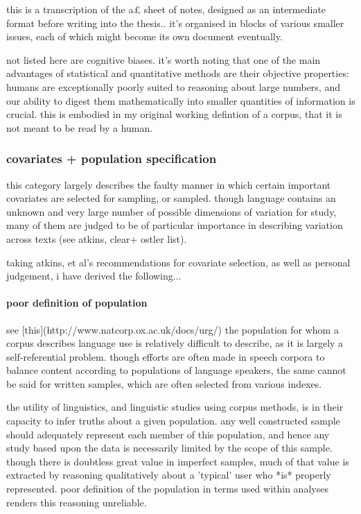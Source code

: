 


this is a transcription of the a£ sheet of notes, designed as an intermediate format before writing into the thesis..  it's organised in blocks of various smaller issues, each of which might become its own document eventually.

not listed here are cognitive biases.  it's worth noting that one of the main advantages of statistical and quantitative methods are their objective properties: humans are exceptionally poorly suited to reasoning about large numbers, and our ability to digest them mathematically into smaller quantities of information is crucial.  this is embodied in my original working defintion of a corpus, that it is not meant to be read by a human.  


\subsubsection{covariates + population specification}
this category largely describes the faulty manner in which certain important covariates are selected for sampling, or sampled.  though language contains an unknown and very large number of possible dimensions of variation for study, many of them are judged to be of particular importance in describing variation across texts (see atkins, clear+ ostler list).

taking atkins, et al's recommendations for covariate selection, as well as personal judgement, i have derived the following...



\paragraph{ poor definition of population}
see [this](http://www.natcorp.ox.ac.uk/docs/urg/)
the population for whom a corpus describes language use is relatively difficult to describe, as it is largely a self-referential problem.  though efforts are often made in speech corpora to balance content according to populations of language speakers, the same cannot be said for written samples, which are often selected from various indexes.

the utility of linguistics, and linguistic studies using corpus methods, is in their capacity to infer truths about a given population.  any well constructed sample should adequately represent each member of this population, and hence any study based upon the data is necessarily limited by the scope of this sample.  though there is doubtless great value in imperfect samples, much of that value is extracted by reasoning qualitatively about a 'typical' user who *is* properly represented.  poor definition of the population in terms used within analyses renders this reasoning unreliable.

